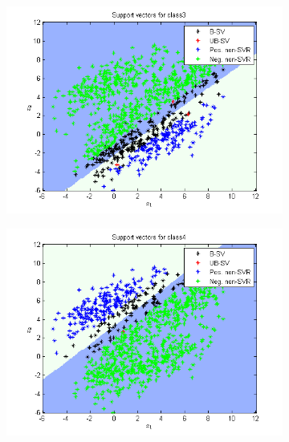 \documentclass{article}
\begin{document}
\begin{figure}
\begin{subfigure}{.5\textwidth}
  \centering
  \includegraphics[width=.8\linewidth]{Classification/1c/c_linear/sv3}
 
\end{subfigure}%
\begin{subfigure}{.5\textwidth}
  \centering
  \includegraphics[width=.8\linewidth]{Classification/1c/c_linear/sv4}
  
\end{subfigure}
\end{figure}
\end{document}
